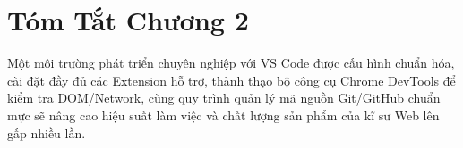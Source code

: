 \section{Tóm Tắt Chương 2}

\begin{noteBox}
Một môi trường phát triển chuyên nghiệp với VS Code được cấu hình chuẩn hóa, cài đặt đầy đủ các Extension hỗ trợ, thành thạo bộ công cụ Chrome DevTools để kiểm tra DOM/Network, cùng quy trình quản lý mã nguồn Git/GitHub chuẩn mực sẽ nâng cao hiệu suất làm việc và chất lượng sản phẩm của kĩ sư Web lên gấp nhiều lần.
\end{noteBox}

